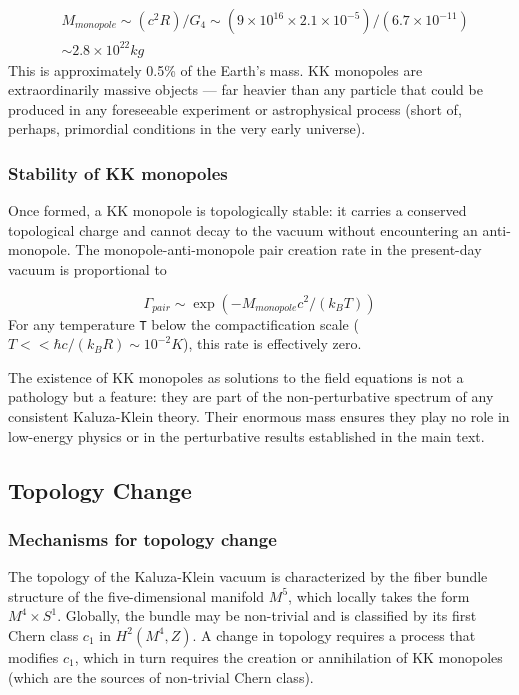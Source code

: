 \documentclass[aps,prd,preprint,superscriptaddress,longbibliography,floatfix]{revtex4-2}
\theoremstyle{remark}
\begin{document}
\begin{align}
    & M_{monopole} \sim  (c^{2} R) / G_{4} \sim  (9 \times 10^{16} \times 2.1 \times 10^{-5}) / (6.7 \times 10^{-11}) \\
    & \sim  2.8 \times 10^{22} kg
\end{align}
This is approximately 0.5\% of the Earth's mass. KK monopoles are extraordinarily massive objects --- far heavier than any particle that could be produced in any foreseeable experiment or astrophysical process (short of, perhaps, primordial conditions in the very early universe).


\subsubsection{Stability of KK monopoles}

Once formed, a KK monopole is topologically stable: it carries a conserved topological charge and cannot decay to the vacuum without encountering an anti-monopole. The monopole-anti-monopole pair creation rate in the present-day vacuum is proportional to


\begin{equation}
    \Gamma_{pair} \sim  \exp(-M_{monopole} c^{2} / (k_B T))
\end{equation}
For any temperature \texttt{T} below the compactification scale ($T << \hbar c / (k_B R) \sim  10^{-2} K$), this rate is effectively zero.

The existence of KK monopoles as solutions to the field equations is not a pathology but a feature: they are part of the non-perturbative spectrum of any consistent Kaluza-Klein theory. Their enormous mass ensures they play no role in low-energy physics or in the perturbative results established in the main text.



\subsection{Topology Change}


\subsubsection{Mechanisms for topology change}

The topology of the Kaluza-Klein vacuum is characterized by the fiber bundle structure of the five-dimensional manifold $M^{5}$, which locally takes the form $M^{4} \times S^{1}$. Globally, the bundle may be non-trivial and is classified by its first Chern class $c_{1}$ in $H^{2}(M^{4}, Z)$. A change in topology requires a process that modifies $c_{1}$, which in turn requires the creation or annihilation of KK monopoles (which are the sources of non-trivial Chern class).
\end{document}
